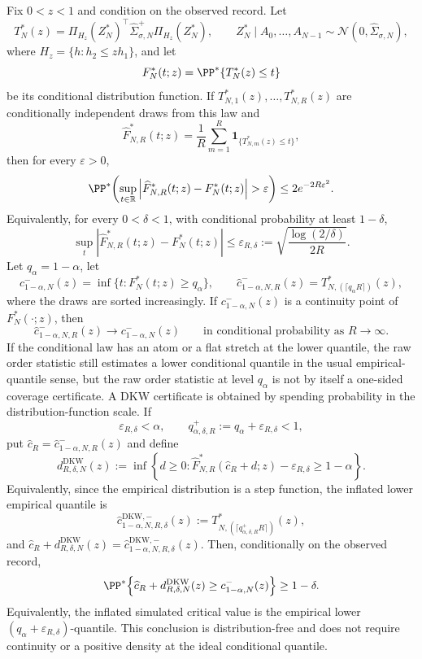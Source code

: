 \begin{lemma}\label{lem:conditional-monte-carlo-quantile-main}
Fix \(0<z<1\) and condition on the observed record.  Let
\[
T_N^\ast(z)=
\Pi_{H_z}(Z_N^\ast)^\top\widehat\Sigma_{\sigma,N}^{+}
\Pi_{H_z}(Z_N^\ast),
\qquad
Z_N^\ast\mid A_0,\ldots,A_{N-1}\sim
\mathcal N(0,\widehat\Sigma_{\sigma,N}),
\]
where \(H_z=\{h:h_2\le zh_1\}\), and let
\[
F_N^\ast(t;z)=\PP^\ast\{T_N^\ast(z)\le t\}
\]
be its conditional distribution function.  If
\(T_{N,1}^\ast(z),\ldots,T_{N,R}^\ast(z)\) are conditionally independent draws
from this law and
\[
\widehat F_{N,R}^\ast(t;z)
=\frac1R\sum_{m=1}^R\mathbf1_{\{T_{N,m}^\ast(z)\le t\}},
\]
then for every \(\varepsilon>0\),
\[
\PP^\ast\!\left(
\sup_{t\in\mathbb R}
\left|\widehat F_{N,R}^\ast(t;z)-F_N^\ast(t;z)\right|>\varepsilon
\right)
\le 2e^{-2R\varepsilon^2}.
\]
Equivalently, for every \(0<\delta<1\), with conditional probability at least
\(1-\delta\),
\[
\sup_t|\widehat F_{N,R}^\ast(t;z)-F_N^\ast(t;z)|
\le
\varepsilon_{R,\delta}:=
\sqrt{\frac{\log(2/\delta)}{2R}} .
\]
Let \(q_\alpha=1-\alpha\), let
\[
c^{-}_{1-\alpha,N}(z)
=\inf\{t:F_N^\ast(t;z)\ge q_\alpha\},
\qquad
\widehat c^{-}_{1-\alpha,N,R}(z)
=T_{N,(\lceil q_\alpha R\rceil)}^\ast(z),
\]
where the draws are sorted increasingly.  If \(c^{-}_{1-\alpha,N}(z)\) is a
continuity point of \(F_N^\ast(\cdot;z)\), then
\[
\widehat c^{-}_{1-\alpha,N,R}(z)
\longrightarrow c^{-}_{1-\alpha,N}(z)
\qquad\text{in conditional probability as }R\to\infty .
\]
If the conditional law has an atom or a flat stretch at the lower quantile,
the raw order statistic still estimates a lower conditional quantile in the
usual empirical-quantile sense, but the raw order statistic at level
\(q_\alpha\) is not by itself a one-sided coverage certificate.  A DKW
certificate is obtained by spending probability in the distribution-function
scale.  If
\[
\varepsilon_{R,\delta}<\alpha,\qquad
q_{\alpha,\delta,R}^{+}:=q_\alpha+\varepsilon_{R,\delta}<1,
\]
put \(\widehat c_R=\widehat c^{-}_{1-\alpha,N,R}(z)\) and define
\[
d^{\mathrm{DKW}}_{R,\delta,N}(z)
:=
\inf\left\{d\ge0:
\widehat F_{N,R}^\ast(\widehat c_R+d;z)-\varepsilon_{R,\delta}
\ge 1-\alpha\right\}.
\]
Equivalently, since the empirical distribution is a step function, the
inflated lower empirical quantile is
\[
\widehat c^{\mathrm{DKW},-}_{1-\alpha,N,R,\delta}(z)
:=T_{N,(\lceil q_{\alpha,\delta,R}^{+}R\rceil)}^\ast(z),
\]
and \(\widehat c_R+d^{\mathrm{DKW}}_{R,\delta,N}(z)
=\widehat c^{\mathrm{DKW},-}_{1-\alpha,N,R,\delta}(z)\).
Then, conditionally on the observed record,
\[
\PP^\ast\!\left\{
\widehat c_R+d^{\mathrm{DKW}}_{R,\delta,N}(z)
\ge c^{-}_{1-\alpha,N}(z)\right\}\ge1-\delta .
\]
Equivalently, the inflated simulated critical value is the empirical lower
\((q_\alpha+\varepsilon_{R,\delta})\)-quantile.  This conclusion is
distribution-free and does not require continuity or a positive density at the
ideal conditional quantile.


\end{lemma}
